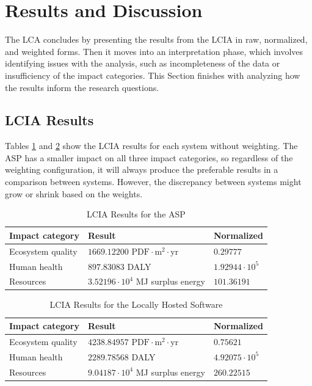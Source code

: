 \documentclass[final,journal,10pt,letterpaper,oneside,twocolumn,compsoc]%
{IEEEtran}
\begin{document}
\section{Results and Discussion}
The LCA concludes by presenting the results from the LCIA in raw, normalized,
and weighted forms. Then it moves into an interpretation phase, which
involves identifying issues with the analysis, such as incompleteness of the
data or insufficiency of the impact categories. This Section finishes with
analyzing how the results inform the research questions.

\subsection{LCIA Results}
Tables \ref{tab:10} and \ref{tab:11} show the LCIA results for each system
without weighting. The ASP
has a smaller impact on all three impact categories, so regardless of the
weighting configuration, it will always produce the preferable results in a
comparison between systems. However, the discrepancy between systems might grow
or shrink based on the weights.

\begin{table}[t!]
  \caption{LCIA Results for the ASP}
  \label{tab:10}
  \centering
    \begin{tabular}{| l | l | l |}
      \hline
      Impact category   & Result             & Normalized \\
      \hline
      Ecosystem quality & $1669.12200 \textrm{ PDF} \cdot \textrm{m}^2 \cdot
                          \textrm{yr}$ & $0.29777$ \\
      Human health      & $897.83083$ DALY   & $1.92944 \cdot 10^5$ \\
      Resources & $3.52196 \cdot 10^4$ MJ surplus energy & $101.36191$ \\
      \hline
    \end{tabular}
\end{table}
\begin{table}[t!]
  \caption{LCIA Results for the Locally Hosted Software}
  \label{tab:11}
  \centering
    \begin{tabular}{| l | l | l |}
      \hline
      Impact category   & Result             & Normalized \\
      \hline
      Ecosystem quality & $4238.84957 \textrm{ PDF} \cdot \textrm{m}^2
                          \cdot \textrm{yr}$ & $0.75621$ \\
      Human health      & $2289.78568$ DALY   & $4.92075 \cdot 10^5$ \\
      Resources & $9.04187 \cdot 10^4$ MJ surplus energy & $260.22515$ \\
      \hline
    \end{tabular}
\end{table}
\end{document}
